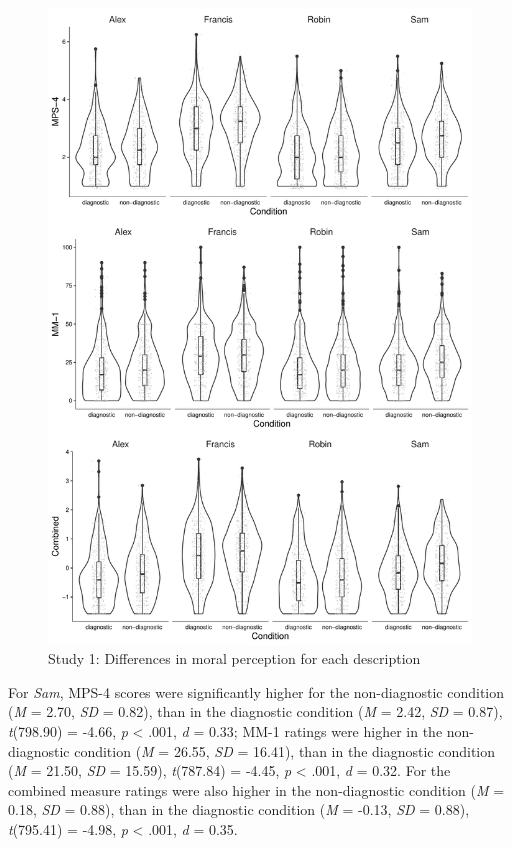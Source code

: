 \documentclass[
  american,
  man,floatsintext]{apa7}
\begin{document}
\begin{figure}[!p]
\includegraphics{Supplementary_files/figure-latex/S1allscenariosPlot-1} \caption{Study 1: Differences in moral perception for each description}\label{fig:S1allscenariosPlot}
\end{figure}

For \emph{Sam}, MPS-4 scores were significantly higher for the non-diagnostic condition (\emph{M} = 2.70, \emph{SD} = 0.82), than in the diagnostic condition (\emph{M} = 2.42, \emph{SD} = 0.87), \emph{t}(798.90) = -4.66, \emph{p} \textless{} .001, \emph{d} = 0.33; MM-1 ratings were higher in the non-diagnostic condition (\emph{M} = 26.55, \emph{SD} = 16.41), than in the diagnostic condition (\emph{M} = 21.50, \emph{SD} = 15.59), \emph{t}(787.84) = -4.45, \emph{p} \textless{} .001, \emph{d} = 0.32. For the combined measure ratings were also higher in the non-diagnostic condition (\emph{M} = 0.18, \emph{SD} = 0.88), than in the diagnostic condition (\emph{M} = -0.13, \emph{SD} = 0.88), \emph{t}(795.41) = -4.98, \emph{p} \textless{} .001, \emph{d} = 0.35.
\end{document}
